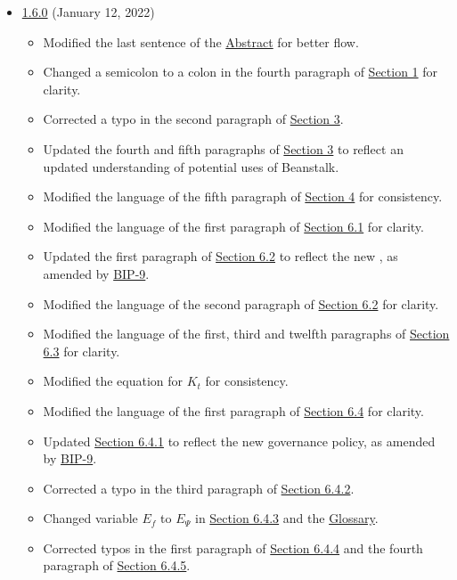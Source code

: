 \documentclass[class=article, crop=false]{standalone}
\begin{document}
\begin{itemize}[topsep=0pt, itemsep=3pt,leftmargin=16pt]
    \item \href{https://github.com/BeanstalkFarms/Beanstalk-Whitepaper/blob/master/version-history/beanstalk1_6_0.pdf}{1.6.0} (January 12, 2022)
    
    \begin{itemize}
        \item Modified the last sentence of the \hyperlink{abstract}{Abstract} for better flow.
        \item Changed a semicolon to a colon in the fourth paragraph of \hyperlink{section.1}{Section 1} for clarity.
        \item Corrected a typo in the second paragraph of \hyperlink{section.3}{Section 3}.
        \item Updated the fourth and fifth paragraphs of \hyperlink{section.3}{Section 3} to reflect an updated understanding of potential uses of Beanstalk.
        \item Modified the language of the fifth paragraph of \hyperlink{section.4}{Section 4} for consistency.
        \item Modified the language of the first paragraph of \hyperlink{subsection.6.1}{Section 6.1} for clarity.
        \item Updated the first paragraph of \hyperlink{subsection.6.2}{Section 6.2} to reflect the new  , as amended by \href{https://bean.money/bip-9}{BIP-9}.
        \item Modified the language of the second paragraph of \hyperlink{subsection.6.2}{Section 6.2} for clarity.
        \item Modified the language of the first, third and twelfth paragraphs of \hyperlink{subsection.6.3}{Section 6.3} for clarity.
        \item Modified the equation for $K_t$ for consistency.
        \item Modified the language of the first paragraph of \hyperlink{subsection.6.4}{Section 6.4} for clarity.
        \item Updated \hyperlink{subsubsection.6.4.1}{Section 6.4.1} to reflect the new governance policy, as amended by \href{https://bean.money/bip-9}{BIP-9}.
        \item Corrected a typo in the third paragraph of \hyperlink{subsubsection.6.4.2}{Section 6.4.2}.
        \item Changed variable $E_f$ to $E_{\Psi}$ in \hyperlink{subsubsection.6.4.3}{Section 6.4.3} and the \hyperlink{subsection.14.11}{Glossary}.
        \item Corrected typos in the first paragraph of \hyperlink{subsubsection.6.4.4}{Section 6.4.4} and the fourth paragraph of \hyperlink{subsubsection.6.4.5}{Section 6.4.5}.

\end{itemize}
\end{itemize}
\end{document}
